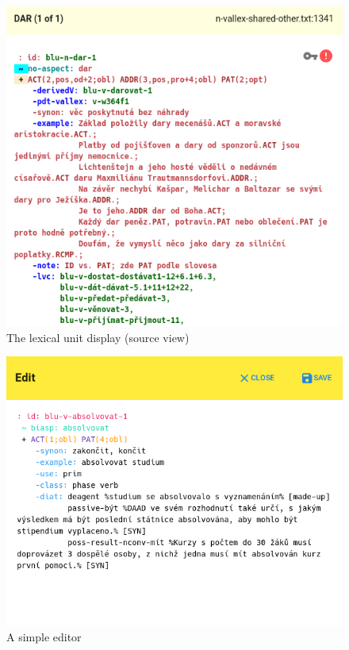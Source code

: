 \documentclass[10pt, a4paper]{article}
\begin{document}
\begin{figure}
    \includegraphics[width=\hsize]{images/ui-lexical-unit-src.png}
    \caption{\label{fig:ui-lexical-unit-src}The lexical unit display (source view)}
\end{figure}

\begin{figure}
    \includegraphics[width=\hsize]{images/ui-editing.png}
    \caption{\label{fig:ui-editing}A simple editor}
\end{figure}
\end{document}
